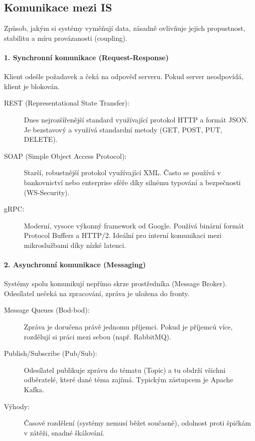 \subsection{Komunikace mezi IS}
Způsob, jakým si systémy vyměňují data, zásadně ovlivňuje jejich propustnost, stabilitu a míru provázanosti (coupling).

\paragraph*{1. Synchronní komunikace (Request-Response)}
Klient odešle požadavek a čeká na odpověď serveru. Pokud server neodpovídá, klient je blokován.

\begin{description}
    \item[REST (Representational State Transfer):] Dnes nejrozšířenější standard využívající protokol HTTP a formát JSON. Je bezstavový a využívá standardní metody (GET, POST, PUT, DELETE).
    \item[SOAP (Simple Object Access Protocol):] Starší, robustnější protokol využívající XML. Často se používá v bankovnictví nebo enterprise sféře díky silnému typování a bezpečnosti (WS-Security).
    \item[gRPC:] Moderní, vysoce výkonný framework od Google. Používá binární formát Protocol Buffers a HTTP/2. Ideální pro interní komunikaci mezi mikroslužbami díky nízké latenci.
\end{description}

\paragraph*{2. Asynchronní komunikace (Messaging)}
Systémy spolu komunikují nepřímo skrze prostředníka (Message Broker). Odesílatel nečeká na zpracování, zpráva je uložena do fronty.

\begin{description}
    \item[Message Queues (Bod-bod):] Zpráva je doručena právě jednomu příjemci. Pokud je příjemců více, rozdělují si práci mezi sebou (např. RabbitMQ).
    \item[Publish/Subscribe (Pub/Sub):] Odesílatel publikuje zprávu do tématu (Topic) a tu obdrží všichni odběratelé, které dané téma zajímá. Typickým zástupcem je Apache Kafka.
    \item[Výhody:] Časové rozdělení (systémy nemusí běžet současně), odolnost proti špičkám v zátěži, snadné škálování.
\end{description}


